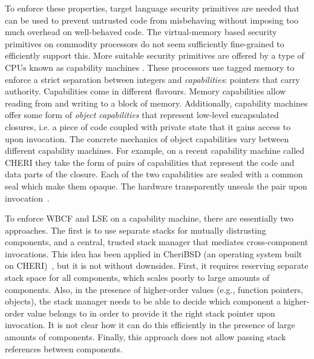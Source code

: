 \documentclass[acmsmall,screen]{acmart}\settopmatter{}
\begin{document}
To enforce these properties, target language security primitives are needed that can be used to prevent untrusted code from misbehaving without imposing too much overhead on well-behaved code.
The virtual-memory based security primitives on commodity processors do not seem sufficiently fine-grained to efficiently support this.
More suitable security primitives are offered by a type of CPUs known as capability machines \citep{levy_capability-based_1984,watson_cheri_2015}.
These processors use tagged memory to enforce a strict separation between integers and {\itshape capabilities}: pointers that carry authority.
Capabilities come in different flavours.
Memory capabilities allow reading from and writing to a block of memory.
Additionally, capability machines offer some form of {\itshape object capabilities} that represent low-level encapsulated closures, i.e. a piece of code coupled with private state that it gains access to upon invocation.
The concrete mechanics of object capabilities vary between different capability machines.
For example, on a recent capability machine called CHERI they take the form of pairs of capabilities that represent the code and data parts of the closure.
Each of the two capabilities are sealed with a common seal which make them opaque.
The hardware transparently unseals the pair upon invocation~\citep{watson_capability_2015,watson_fast_2016}.

To enforce WBCF and LSE on a capability machine, there are essentially two approaches.
The first is to use separate stacks for mutually distrusting components, and a central, trusted stack manager that mediates cross-component invocations.
This idea has been applied in CheriBSD (an operating system built on CHERI)~\citep{watson_capability_2015}, but it is not without downsides.
First, it requires reserving separate stack space for all components, which scales poorly to large amounts of components.
Also, in the presence of higher-order values (e.g., function pointers, objects), the stack manager needs to be able to decide which component a higher-order value belongs to in order to provide it the right stack pointer upon invocation.
It is not clear how it can do this efficiently in the presence of large amounts of components.
Finally, this approach does not allow passing stack references between components.
\end{document}
